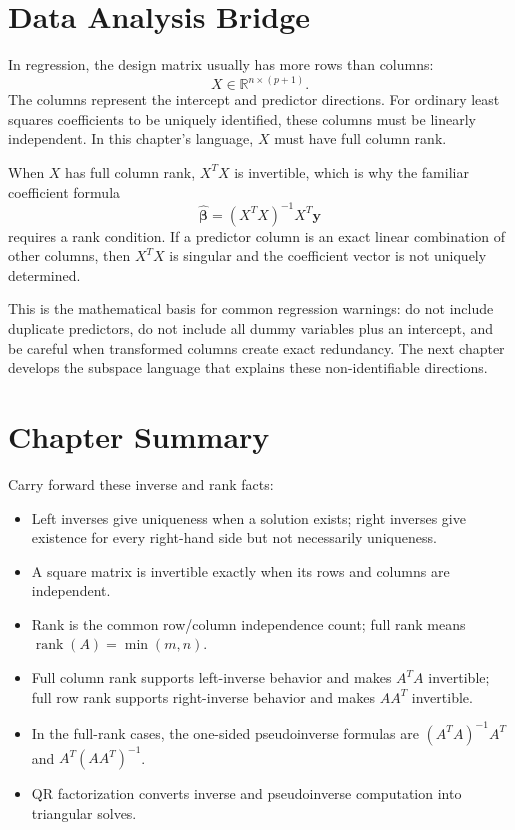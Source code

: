 \section{Data Analysis Bridge}
\label{mf:ch10-data-analysis-bridge}

In regression, the design matrix usually has more rows than columns:
\[
    X\in\mathbb{R}^{n\times(p+1)}.
\]
The columns represent the intercept and predictor directions. For ordinary least squares coefficients to be uniquely identified, these columns must be linearly independent. In this chapter's language, \(X\) must have full column rank.

When \(X\) has full column rank, \(X^TX\) is invertible, which is why the familiar coefficient formula
\[
    \widehat{\boldsymbol\beta}=(X^TX)^{-1}X^T\mathbf{y}
\]
requires a rank condition. If a predictor column is an exact linear combination of other columns, then \(X^TX\) is singular and the coefficient vector is not uniquely determined.

This is the mathematical basis for common regression warnings: do not include duplicate predictors, do not include all dummy variables plus an intercept, and be careful when transformed columns create exact redundancy. The next chapter develops the subspace language that explains these non-identifiable directions.

\section{Chapter Summary}
\label{mf:matrix-inverses-rank-summary}

Carry forward these inverse and rank facts:
\begin{itemize}
    \item Left inverses give uniqueness when a solution exists; right inverses give existence for every right-hand side but not necessarily uniqueness.
    \item A square matrix is invertible exactly when its rows and columns are independent.
    \item Rank is the common row/column independence count; full rank means \(\operatorname{rank}(A)=\min(m,n)\).
    \item Full column rank supports left-inverse behavior and makes \(A^TA\) invertible; full row rank supports right-inverse behavior and makes \(AA^T\) invertible.
    \item In the full-rank cases, the one-sided pseudoinverse formulas are \((A^TA)^{-1}A^T\) and \(A^T(AA^T)^{-1}\).
    \item QR factorization converts inverse and pseudoinverse computation into triangular solves.
\end{itemize}
